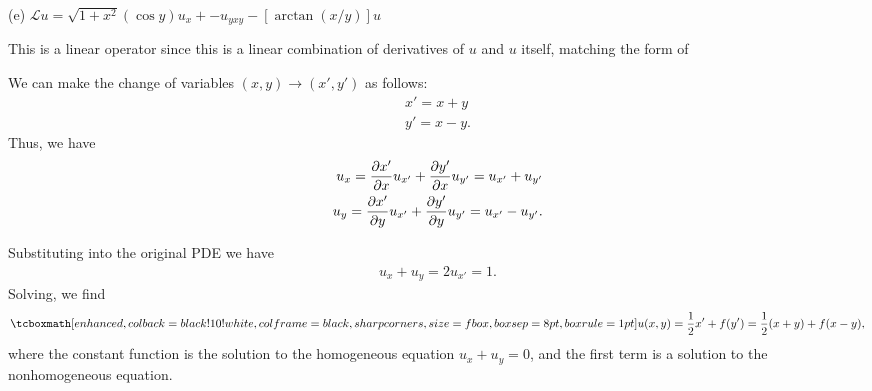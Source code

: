 (e) $\displaystyle \mathcal{L}u = \sqrt{1 + x^2}(\cos{y})u_{x} +  - u_{yxy} - [\arctan(x/y)]u$

This is a linear operator since this is a linear combination of derivatives of $u$ and $u$ itself, matching the form of 



We can make the change of variables $(x,y) \rightarrow (x',y')$ as follows:
\begin{align}
    \label{eq:change-var}
    x' = x + y \\
    y' = x - y
.\end{align}
Thus, we have
\begin{align}
    \label{eq:diff-change} 
    u_{x} = \pdv{x'}{x}u_{x'} + \pdv{y'}{x}u_{y'} = u_{x'} + u_{y'} \\
    u_{y} = \pdv{x'}{y}u_{x'} + \pdv{y'}{y}u_{y'} = u_{x'} - u_{y'}
.\end{align}

Substituting into the original PDE we have
\begin{eqnarray}
    \label{eq:changed-eq}
    u_{x} + u_{y} = 2 u_{x'} = 1     
.\end{eqnarray}
Solving, we find
\begin{eqnarray}
    \label{eq:solution-2}
    \eqbox{
    u(x,y) = \frac{1}{2}x' + f(y') = \frac{1}{2}(x + y) + f(x - y)
    }
,\end{eqnarray}
where the constant function is the solution to the homogeneous equation $u_{x} + u_{y} = 0$, and the first term is a solution to the nonhomogeneous equation.




